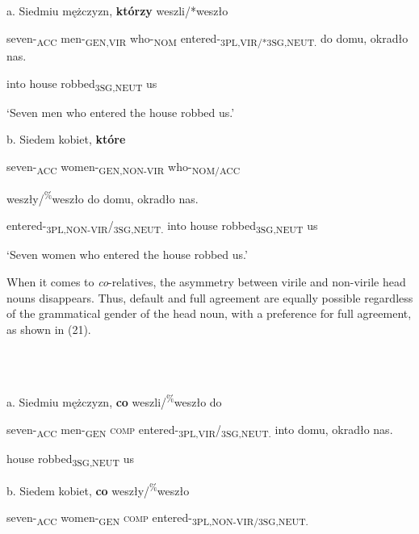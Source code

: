 \documentclass[output=paper]{langsci/langscibook}
\begin{document}
\ea%
    \label{ex:key:20}
    \gll\\
        \\
    \glt
    \z

          a.   Siedmiu   mężczyzn,  \textbf{którzy}   weszli/*weszło         

seven-\textsubscript{ACC}   men-\textsubscript{GEN,VIR}   who-\textsubscript{NOM}  entered-\textsubscript{3PL,VIR/*3SG,NEUT.}         do   domu,   okradło     nas.  

    into  house     robbed\textsubscript{3SG,NEUT}   us

    ‘Seven men who entered the house robbed us.’

b.   Siedem   kobiet,     \textbf{które}     

    seven-\textsubscript{ACC}   women-\textsubscript{GEN,NON-VIR} who-\textsubscript{NOM/ACC}  

    weszły/\textsuperscript{\%}weszło       do   domu,   okradło     nas.

    entered-\textsubscript{3PL,NON-VIR}/\textsubscript{3SG,NEUT.}  into   house     robbed\textsubscript{3SG,NEUT}   us

 ‘Seven women who entered the house robbed us.’

\begin{styleListParagraph}
When it comes to \textit{co}{}-relatives, the asymmetry between virile and non-virile head nouns disappears. Thus, default and full agreement are equally possible regardless of the grammatical gender of the head noun, with a preference for full agreement, as shown in (21).
\end{styleListParagraph}

\ea%
    \label{ex:key:21}
    \gll\\
        \\
    \glt
    \z

          a.   Siedmiu   mężczyzn,   \textbf{co}   weszli/\textsuperscript{\%}weszło     do 

    seven-\textsubscript{ACC}   men-\textsubscript{GEN}   \textsc{comp}   entered-\textsubscript{3PL,VIR}/\textsubscript{3SG,NEUT.} into           domu, okradło     nas.

    house   robbed\textsubscript{3SG,NEUT} us

  b.   Siedem   kobiet,   \textbf{co}   weszły/\textsuperscript{\%}weszło         

    seven-\textsubscript{ACC}   women-\textsubscript{GEN}   \textsc{comp}   entered-\textsubscript{3PL,NON-VIR/3SG,NEUT.} 
\end{document}
